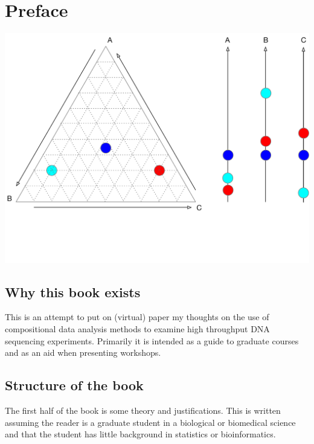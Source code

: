 \documentclass[onecolumn]{article}
\author{}
\date{\vspace{-2.5em}}
\begin{document}
{
\setcounter{tocdepth}{3}
\tableofcontents
}
\hypertarget{preface}{%
\section*{Preface}\label{preface}}

\includegraphics{figs/simplex.pdf}

\hypertarget{why-this-book-exists}{%
\subsection*{Why this book exists}\label{why-this-book-exists}}

This is an attempt to put on (virtual) paper my thoughts on the use of compositional data analysis methods to examine high throughput DNA sequencing experiments. Primarily it is intended as a guide to graduate courses and as an aid when presenting workshops.

\hypertarget{structure-of-the-book}{%
\subsection*{Structure of the book}\label{structure-of-the-book}}

The first half of the book is some theory and justifications. This is written assuming the reader is a graduate student in a biological or biomedical science and that the student has little background in statistics or bioinformatics.
\end{document}
